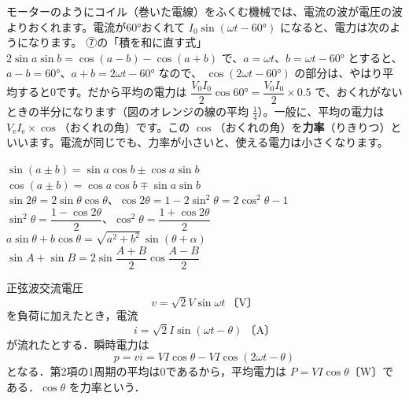 モーターのようにコイル（巻いた電線）をふくむ機械では、電流の波が電圧の波よりおくれます。電流が60°おくれて $I_0\sin(\omega t-60°)$ になると、電力は次のようになります。
⑦の「積を和に直す式」$2\sin a\sin b=\cos(a-b)-\cos(a+b)$ で、$a=\omega t$、$b=\omega t-60°$ とすると、$a-b=60°$、$a+b=2\omega t-60°$ なので、
$\cos(2\omega t-60°)$ の部分は、やはり平均すると0です。だから平均の電力は $\dfrac{V_0I_0}{2}\cos60°=\dfrac{V_0I_0}{2}\times0.5$ で、おくれがないときの半分になります（図のオレンジの線の平均 $\frac14$）。一般に、平均の電力は $V_{\mathrm{e}}I_{\mathrm{e}}\times\cos$（おくれの角）です。この $\cos$（おくれの角）を\textbf{力率}（りきりつ）といいます。電流が同じでも、力率が小さいと、使える電力は小さくなります。










\begin{taisetsu}
\def\tsl#1{\makebox[5.4\zw][l]{\sffamily\bfseries\small\color{\bkTT}#1}}
\tsl{加法定理}$\sin(a\pm b)=\sin a\cos b\pm\cos a\sin b$\\[3pt]
\tsl{}$\cos(a\pm b)=\cos a\cos b\mp\sin a\sin b$\\[3pt]
\tsl{2倍角}$\sin2\theta=2\sin\theta\cos\theta$、$\cos2\theta=1-2\sin^2\theta=2\cos^2\theta-1$\\[3pt]
\tsl{}$\sin^2\theta=\dfrac{1-\cos2\theta}{2}$、$\cos^2\theta=\dfrac{1+\cos2\theta}{2}$\\[3pt]
\tsl{合成}$a\sin\theta+b\cos\theta=\sqrt{a^2+b^2}\,\sin(\theta+\alpha)$\\[3pt]
\tsl{和を積に}$\sin A+\sin B=2\sin\dfrac{A+B}{2}\cos\dfrac{A-B}{2}$
\end{taisetsu}

\begin{senmonsho}[電気回路の教科書ふうの書き方]
\begin{bkhonbun}
正弦波交流電圧
\[ v=\sqrt2V\sin\omega t\ \text{〔V〕} \]
を負荷に加えたとき，電流
\[ i=\sqrt2I\sin(\omega t-\theta)\ \text{〔A〕} \]
が流れたとする．瞬時電力は
\[ p=vi=VI\cos\theta-VI\cos(2\omega t-\theta) \]
となる．第2項の1周期の平均は0であるから，平均電力は $P=VI\cos\theta$〔W〕である．$\cos\theta$ を力率という．
\end{bkhonbun}
\end{senmonsho}

